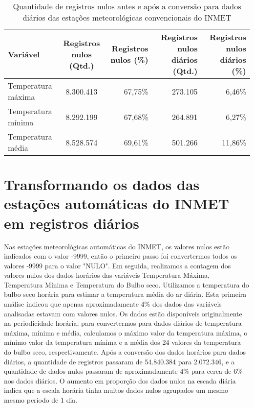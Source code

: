 \begin{table}[H]
\caption{Quantidade de registros nulos antes e após a conversão para dados diários das estações meteorológicas convencionais do INMET}
\label{tab:estacoes_convencionais_inmet_dados_nulos}
\begin{adjustbox}{width=\textwidth}
\begin{tabular}{|l|c|r|r|r|}
\hline
\textbf{Variável} & \textbf{Registros nulos (Qtd.)} & \textbf{Registros nulos (\%)} & \textbf{Registros nulos diários (Qtd.)} & \textbf{Registros nulos diários (\%)} \\
\hline
Temperatura máxima  & 8.300.413 & 67,75\% & 273.105 & 6,46\% \\
\hline
Temperatura mínima & 8.292.199 & 67,68\% & 264.891 & 6,27\% \\
\hline
Temperatura média & 8.528.574 & 69,61\% & 501.266 & 11,86\% \\
\hline
\end{tabular}
\end{adjustbox}
\end{table}

\section{Transformando os dados das estações automáticas do INMET em registros diários}

Nas estações meteorológicas automáticas do INMET, os valores nulos estão indicados com o valor -9999, então o primeiro passo foi convertermos todos os valores -9999 para o valor "NULO". Em seguida, realizamos a contagem dos valores nulos dos dados horários das variáveis Temperatura Máxima, Temperatura Mínima e Temperatura do Bulbo seco. Utilizamos a temperatura do bulbo seco horária para estimar a temperatura média do ar diária. Esta primeira análise indicou que apenas aproximadamente 4\% dos dados das variáveis analisadas estavam com valores nulos. Os dados estão disponíveis originalmente na periodicidade horária, para convertermos para dados diários de temperatura máxima, mínima e média, calculamos o máximo valor da temperatura máxima, o mínimo valor da temperatura mínima e a média dos 24 valores da temperatura do bulbo seco, respectivamente. Após a conversão dos dados horários para dados diários, a quantidade de registros passaram de 54.840.384 para 2.072.346, e a quantidade de dados nulos passaram de aproximadamente 4\% para cerca de 6\% nos dados diários. O aumento em proporção dos dados nulos na escada diária indica que a escala horária tinha muitos dados nulos agrupados um mesmo mesmo período de 1 dia. 


